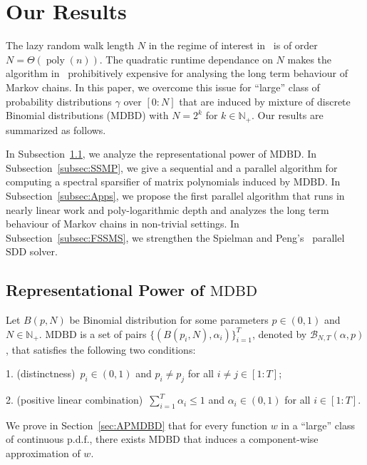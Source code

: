\documentclass[11pt]{article}
\newcommand{\SDD}{\mathrm{SDD}}
\newcommand{\MDBD}{\mathrm{MDBD}}
\newcommand{\BNTap}{\mathcal{B}_{N,T}(\alpha,p)}
\newcommand{\N}{\mathbb{N}}
\newcommand{\poly}{\operatorname{poly}}
\renewcommand{\leq}{\leqslant}
\numberwithin{thm}{section}
\begin{document}
\section{Our Results}

The lazy random walk length $N$ in the regime of interest in~\cite{SJ89,ACL06,OT12} is of order $N=\Theta(\poly(n))$. The quadratic runtime dependance on $N$ makes the algorithm in~\cite{CCLPT15} prohibitively expensive for analysing the long term behaviour of Markov chains. In this paper, we overcome this issue for ``large'' class of probability distributions $\gamma$ over $[0:N]$ that are induced by mixture of discrete Binomial distributions ($\MDBD$) with $N=2^k$ for $k\in\N_+$. Our results are summarized as follows.

In Subsection~\ref{subsec:RPMDBD}, we analyze the representational power of $\MDBD$. In Subsection~\ref{subsec:SSMP}, we give a sequential and a parallel algorithm for computing a spectral sparsifier of matrix polynomials induced by $\MDBD$. In Subsection~\ref{subsec:Apps}, we propose the first parallel algorithm that runs in nearly linear work and poly-logarithmic depth and analyzes the long term behaviour of Markov chains in non-trivial settings. In Subsection~\ref{subsec:FSSMS}, we strengthen the Spielman and Peng's~\cite{PS14} parallel $\SDD$ solver.


\subsection{Representational Power of $\MDBD$}\label{subsec:RPMDBD}

Let $B(p,N)$ be Binomial distribution for some parameters $p\in(0,1)$ and $N\in\N_+$. $\MDBD$ is a set of pairs $\{(B(p_{i},N),\alpha_{i})\}_{i=1}^{T}$, denoted by $\BNTap$, that satisfies the following two conditions:

1. (distinctness) $\, p_{i}\in(0,1)$ and $p_{i}\neq p_{j}$ for all $i\neq j\in[1:T]$;

2. (positive linear combination) $\, \sum_{i=1}^{T}\alpha_{i}\leq1$ and $\alpha_{i}\in(0,1)$ for all $i\in[1:T]$.


We prove in Section~\ref{sec:APMDBD} that for every function $w$ in a ``large'' class of continuous p.d.f., there exists $\MDBD$ that induces a component-wise approximation of $w$.
\end{document}
